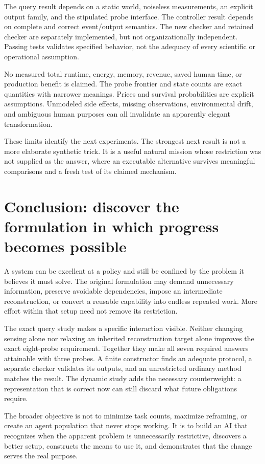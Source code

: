 \documentclass[11pt,letterpaper]{article}
\theoremstyle{remark}\newtheorem{remark}{Remark}[section]
\begin{document}
The query result depends on a static world, noiseless measurements, an explicit output family, and the stipulated probe interface. The controller result depends on complete and correct event/output semantics. The new checker and retained checker are separately implemented, but not organizationally independent. Passing tests validates specified behavior, not the adequacy of every scientific or operational assumption.

No measured total runtime, energy, memory, revenue, saved human time, or production benefit is claimed. The probe frontier and state counts are exact quantities with narrower meanings. Prices and survival probabilities are explicit assumptions. Unmodeled side effects, missing observations, environmental drift, and ambiguous human purposes can all invalidate an apparently elegant transformation.

These limits identify the next experiments. The strongest next result is not a more elaborate synthetic trick. It is a useful natural mission whose restriction was not supplied as the answer, where an executable alternative survives meaningful comparisons and a fresh test of its claimed mechanism.

\section{Conclusion: discover the formulation in which progress becomes possible}
A system can be excellent at a policy and still be confined by the problem it believes it must solve. The original formulation may demand unnecessary information, preserve avoidable dependencies, impose an intermediate reconstruction, or convert a reusable capability into endless repeated work. More effort within that setup need not remove its restriction.

The exact query study makes a specific interaction visible. Neither changing sensing alone nor relaxing an inherited reconstruction target alone improves the exact eight-probe requirement. Together they make all seven required answers attainable with three probes. A finite constructor finds an adequate protocol, a separate checker validates its outputs, and an unrestricted ordinary method matches the result. The dynamic study adds the necessary counterweight: a representation that is correct now can still discard what future obligations require.

The broader objective is not to minimize task counts, maximize reframing, or create an agent population that never stops working. It is to build an AI that recognizes when the apparent problem is unnecessarily restrictive, discovers a better setup, constructs the means to use it, and demonstrates that the change serves the real purpose.
\end{document}
